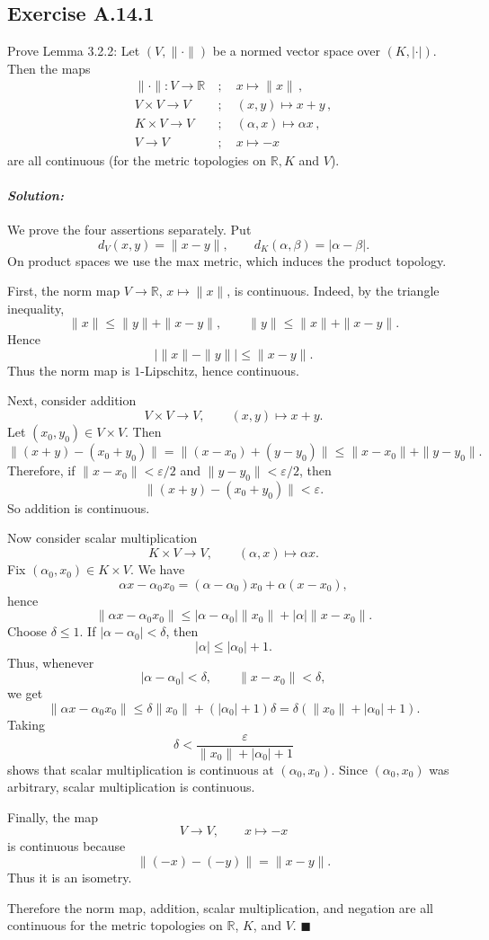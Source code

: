 \documentclass[12pt, a4paper]{article}
\newenvironment{solution}
  {\paragraph{\textit{Solution:}}\par\medskip}
  {\hfill$\blacksquare$\vspace{0.1cm}}
\begin{document}
\subsection*{Exercise A.14.1}
Prove Lemma 3.2.2: Let $(V, \| \cdot \|)$ be a normed vector space over $(K, | \cdot |)$. Then the maps
\begin{align*}
    \| \cdot \| : V \longrightarrow \mathbb{R} \ &; \quad x \longmapsto \|x\| \,, \\
    V \times V \longrightarrow V \ &; \quad (x, y) \longmapsto x + y \,, \\
    K \times V \longrightarrow V \ &; \quad (\alpha, x) \longmapsto \alpha x \,, \\
    V \longrightarrow V \ &; \quad x \longmapsto -x
\end{align*}
are all continuous (for the metric topologies on $\mathbb{R}, K$ and $V$).
\begin{solution}
We prove the four assertions separately. Put
\[
d_V(x,y)=\|x-y\|,\qquad d_K(\alpha,\beta)=|\alpha-\beta|.
\]
On product spaces we use the max metric, which induces the product topology.

First, the norm map \(V\to \mathbb R\), \(x\mapsto \|x\|\), is continuous.
Indeed, by the triangle inequality,
\[
\|x\|\le \|y\|+\|x-y\|,
\qquad
\|y\|\le \|x\|+\|x-y\|.
\]
Hence
\[
\bigl|\|x\|-\|y\|\bigr|\le \|x-y\|.
\]
Thus the norm map is \(1\)-Lipschitz, hence continuous.

Next, consider addition
\[
V\times V\longrightarrow V,\qquad (x,y)\longmapsto x+y.
\]
Let \((x_0,y_0)\in V\times V\). Then
\[
\|(x+y)-(x_0+y_0)\|
=
\|(x-x_0)+(y-y_0)\|
\le \|x-x_0\|+\|y-y_0\|.
\]
Therefore, if \(\|x-x_0\|<\varepsilon/2\) and \(\|y-y_0\|<\varepsilon/2\), then
\[
\|(x+y)-(x_0+y_0)\|<\varepsilon.
\]
So addition is continuous.

Now consider scalar multiplication
\[
K\times V\longrightarrow V,\qquad (\alpha,x)\longmapsto \alpha x.
\]
Fix \((\alpha_0,x_0)\in K\times V\). We have
\[
\alpha x-\alpha_0x_0
=
(\alpha-\alpha_0)x_0+\alpha(x-x_0),
\]
hence
\[
\|\alpha x-\alpha_0x_0\|
\le
|\alpha-\alpha_0|\|x_0\|+|\alpha|\|x-x_0\|.
\]
Choose \(\delta\le 1\). If \(|\alpha-\alpha_0|<\delta\), then
\[
|\alpha|\le |\alpha_0|+1.
\]
Thus, whenever
\[
|\alpha-\alpha_0|<\delta,\qquad \|x-x_0\|<\delta,
\]
we get
\[
\|\alpha x-\alpha_0x_0\|
\le
\delta\|x_0\|+(|\alpha_0|+1)\delta
=
\delta(\|x_0\|+|\alpha_0|+1).
\]
Taking
\[
\delta<\frac{\varepsilon}{\|x_0\|+|\alpha_0|+1}
\]
shows that scalar multiplication is continuous at \((\alpha_0,x_0)\). Since
\((\alpha_0,x_0)\) was arbitrary, scalar multiplication is continuous.

Finally, the map
\[
V\longrightarrow V,\qquad x\longmapsto -x
\]
is continuous because
\[
\|(-x)-(-y)\|=\|x-y\|.
\]
Thus it is an isometry.

Therefore the norm map, addition, scalar multiplication, and negation are all
continuous for the metric topologies on \(\mathbb R\), \(K\), and \(V\).
\end{solution}
\end{document}
